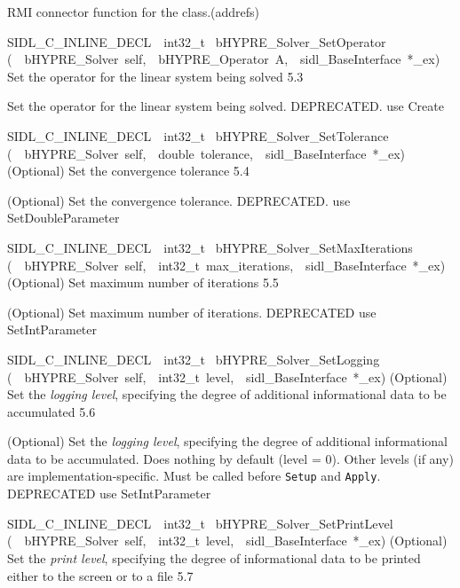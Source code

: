 \documentclass{article}
\begin{document}
\begin{cxxentry}
\begin{cxxfunction}
\begin{cxxdoc}
RMI connector function for the class.(addrefs)
\end{cxxdoc}
\end{cxxfunction}
\begin{cxxfunction}
{SIDL\_C\_INLINE\_DECL\ \ int32\_t\ }
        {bHYPRE\_Solver\_SetOperator}
        {(\ \ bHYPRE\_Solver\ self,\ \ bHYPRE\_Operator\ A,\ \ sidl\_BaseInterface\ *\_ex)}
        {
Set the operator for the linear system being solved}
        {5.3}
\begin{cxxdoc}

Set the operator for the linear system being solved.
DEPRECATED.  use Create
\end{cxxdoc}
\end{cxxfunction}
\begin{cxxfunction}
{SIDL\_C\_INLINE\_DECL\ \ int32\_t\ }
        {bHYPRE\_Solver\_SetTolerance}
        {(\ \ bHYPRE\_Solver\ self,\ \ double\ tolerance,\ \ sidl\_BaseInterface\ *\_ex)}
        {
(Optional) Set the convergence tolerance}
        {5.4}
\begin{cxxdoc}

(Optional) Set the convergence tolerance.
DEPRECATED.  use SetDoubleParameter
\end{cxxdoc}
\end{cxxfunction}
\begin{cxxfunction}
{SIDL\_C\_INLINE\_DECL\ \ int32\_t\ }
        {bHYPRE\_Solver\_SetMaxIterations}
        {(\ \ bHYPRE\_Solver\ self,\ \ int32\_t\ max\_iterations,\ \ sidl\_BaseInterface\ *\_ex)}
        {
(Optional) Set maximum number of iterations}
        {5.5}
\begin{cxxdoc}

(Optional) Set maximum number of iterations.
DEPRECATED   use SetIntParameter
\end{cxxdoc}
\end{cxxfunction}
\begin{cxxfunction}
{SIDL\_C\_INLINE\_DECL\ \ int32\_t\ }
        {bHYPRE\_Solver\_SetLogging}
        {(\ \ bHYPRE\_Solver\ self,\ \ int32\_t\ level,\ \ sidl\_BaseInterface\ *\_ex)}
        {
(Optional) Set the {\it logging level}, specifying the degree
of additional informational data to be accumulated}
        {5.6}
\begin{cxxdoc}

(Optional) Set the {\it logging level}, specifying the degree
of additional informational data to be accumulated.  Does
nothing by default (level = 0).  Other levels (if any) are
implementation-specific.  Must be called before {\tt Setup}
and {\tt Apply}.
DEPRECATED   use SetIntParameter
\end{cxxdoc}
\end{cxxfunction}
\begin{cxxfunction}
{SIDL\_C\_INLINE\_DECL\ \ int32\_t\ }
        {bHYPRE\_Solver\_SetPrintLevel}
        {(\ \ bHYPRE\_Solver\ self,\ \ int32\_t\ level,\ \ sidl\_BaseInterface\ *\_ex)}
        {
(Optional) Set the {\it print level}, specifying the degree
of informational data to be printed either to the screen or
to a file}
        {5.7}
\begin{cxxdoc}


\end{cxxdoc}
\end{cxxfunction}
\end{cxxentry}
\end{document}
